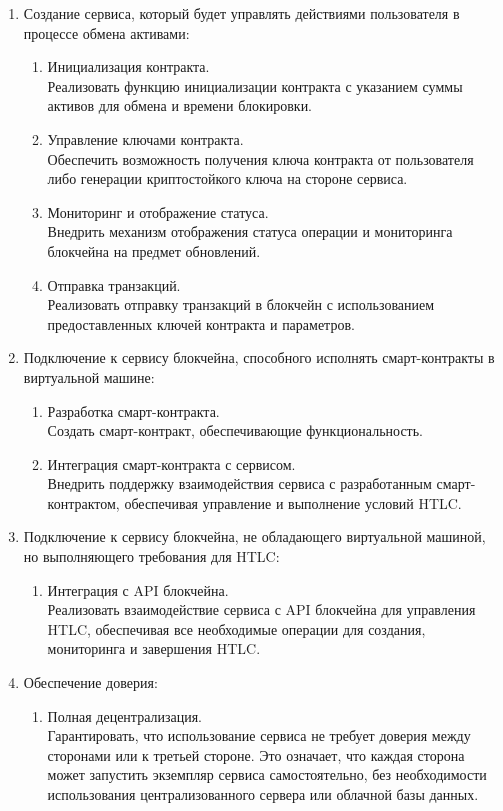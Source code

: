 \begin{enumerate}
\item Создание сервиса, который будет управлять действиями пользователя в процессе обмена активами:
	\begin{enumerate}[label*=\arabic*.]
	\item Инициализация контракта.\\
	Реализовать функцию инициализации контракта с указанием суммы активов для обмена и времени блокировки.
	\item Управление ключами контракта.\\
	Обеспечить возможность получения ключа контракта от пользователя либо генерации криптостойкого ключа на стороне сервиса.
	\item Мониторинг и отображение статуса.\\
	Внедрить механизм отображения статуса операции и мониторинга блокчейна на предмет обновлений.
	\item Отправка транзакций.\\
	Реализовать отправку транзакций в блокчейн с использованием предоставленных ключей контракта и параметров.
	\end{enumerate}
\item Подключение к сервису блокчейна, способного исполнять смарт-контракты в виртуальной машине:
	\begin{enumerate}[label*=\arabic*.]
	\item Разработка смарт-контракта.\\
	Создать смарт-контракт, обеспечивающие функциональность.
	\item Интеграция смарт-контракта с сервисом.\\
	Внедрить поддержку взаимодействия сервиса с разработанным смарт-контрактом, обеспечивая управление и выполнение условий HTLC.
	\end{enumerate}
\item Подключение к сервису блокчейна, не обладающего виртуальной машиной, но выполняющего требования для HTLC:
	\begin{enumerate}[label*=\arabic*.]
	\item Интеграция с API блокчейна.\\
	Реализовать взаимодействие сервиса с API блокчейна для управления HTLC, обеспечивая все необходимые операции для создания, мониторинга и завершения HTLC.
	\end{enumerate}
\item Обеспечение доверия:
	\begin{enumerate}[label*=\arabic*.]
	\item Полная децентрализация.\\
	Гарантировать, что использование сервиса не требует доверия между сторонами или к третьей стороне. Это означает, что каждая сторона может запустить экземпляр сервиса самостоятельно, без необходимости использования централизованного сервера или облачной базы данных.
	\end{enumerate}
\end{enumerate}

